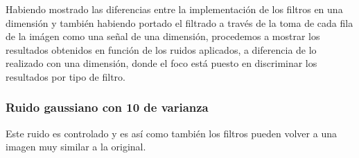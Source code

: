 Habiendo mostrado las diferencias entre la implementaci\'on de los filtros en
una dimensi\'on y tambi\'en habiendo portado el filtrado a trav\'es de la toma de cada
fila de la im\'agen como una se\~nal de una dimensi\'on, procedemos a mostrar
los resultados obtenidos en funci\'on de los ruidos aplicados, a diferencia de
lo realizado con una dimensi\'on, donde el foco est\'a puesto en discriminar los
resultados por tipo de filtro.

\subsubsection{Ruido gaussiano con 10 de varianza}

Este ruido es controlado y es as\'i como tambi\'en los filtros pueden volver a
una imagen muy similar a la original.

